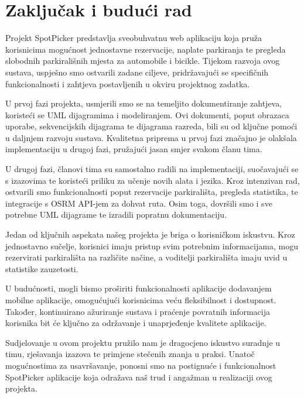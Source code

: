 \chapter{Zaključak i budući rad}
{Projekt SpotPicker predstavlja sveobuhvatnu web aplikaciju koja pruža korisnicima mogućnost jednostavne rezervacije, naplate parkiranja te pregleda slobodnih parkirališnih mjesta za automobile i bicikle. Tijekom razvoja ovog sustava, uspješno smo ostvarili zadane ciljeve, pridržavajući se specifičnih funkcionalnosti i zahtjeva postavljenih u okviru projektnog zadatka.
	
U prvoj fazi projekta, usmjerili smo se na temeljito dokumentiranje zahtjeva, koristeći se UML dijagramima i modeliranjem. Ovi dokumenti, poput obrazaca uporabe, sekvencijskih dijagrama te dijagrama razreda, bili su od ključne pomoći u daljnjem razvoju sustava. Kvalitetna priprema u prvoj fazi značajno je olakšala implementaciju u drugoj fazi, pružajući jasan smjer svakom  članu tima.
	
U drugoj fazi, članovi tima su samostalno radili na implementaciji, suočavajući se s izazovima te koristeći priliku za učenje novih alata i jezika. Kroz intenzivan rad, ostvarili smo funkcionalnosti poput rezervacije parkirališta, pregleda statistika, te integracije s OSRM API-jem za dohvat ruta. Osim toga, dovršili smo i sve potrebne UML dijagrame te izradili popratnu dokumentaciju.
	
Jedan od ključnih aspekata našeg projekta je briga o korisničkom iskustvu. Kroz jednostavno sučelje, korisnici imaju pristup svim potrebnim informacijama, mogu rezervirati parkirališta na različite načine, a voditelji parkirališta imaju uvid u statistike zauzetosti.
	
U budućnosti, mogli bismo proširiti funkcionalnosti aplikacije dodavanjem mobilne aplikacije, omogućujući korisnicima veću fleksibilnost i dostupnost. Također, kontinuirano ažuriranje sustava i praćenje povratnih informacija korisnika bit će ključno za održavanje i unaprjeđenje kvalitete aplikacije.
	
Sudjelovanje u ovom projektu pružilo nam je dragocjeno iskustvo suradnje u timu, rješavanja izazova te primjene stečenih znanja u praksi. Unatoč mogućnostima za usavršavanje, ponosni smo na postignuće i funkcionalnost SpotPicker aplikacije koja odražava naš trud i angažman u realizaciji ovog projekta.}